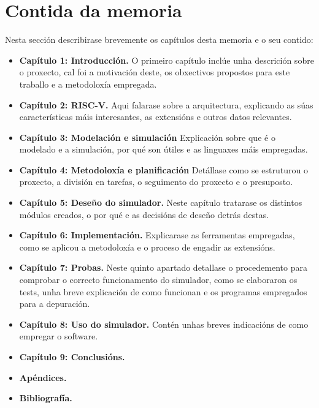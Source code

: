 \section{Contida da memoria}
\label{sec:contido_memoria}
Nesta sección describirase brevemente os capítulos desta memoria e o seu contido: 
\begin{itemize}
    \item \textbf{Capítulo 1: Introducción.}  O primeiro capítulo inclúe unha descrición sobre o proxecto, cal foi a motivación deste, os obxectivos propostos para este traballo e a metodoloxía empregada.
    \item \textbf{Capítulo 2: RISC-V.} Aqui falarase sobre a arquitectura, explicando as súas características máis interesantes, as extensións e outros datos relevantes.
    \item \textbf{Capítulo 3: Modelación e simulación} Explicación sobre que é o modelado e a simulación, por qué son útiles e as linguaxes máis empregadas.
    \item \textbf{Capítulo 4: Metodoloxía e planificación} Detállase como se estruturou o proxecto, a división en tarefas, o seguimento do proxecto e o presuposto.
    \item \textbf{Capítulo 5: Deseño do simulador.} Neste capítulo tratarase os distintos módulos creados, o por qué e as decisións de deseño detrás destas.
    \item \textbf{Capítulo 6: Implementación.} Explicarase as ferramentas empregadas, como se aplicou a metodoloxía e o proceso de engadir as extensións.
    \item \textbf{Capítulo 7: Probas.} Neste quinto apartado detallase o procedemento para comprobar o correcto funcionamento do simulador, como se elaboraron os tests, unha breve explicación de como funcionan e os programas empregados para a depuración.
    \item \textbf{Capítulo 8: Uso do simulador.} Contén unhas breves indicacións de como empregar o software.
    \item \textbf{Capítulo 9: Conclusións.}
    \item \textbf{Apéndices. }
    \item \textbf{Bibliografía. }
    
\end{itemize}

